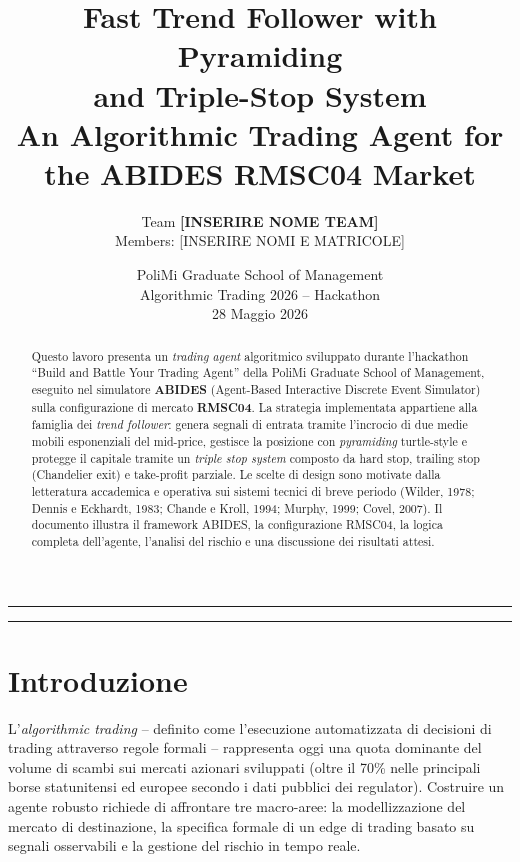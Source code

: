 \documentclass[11pt,a4paper]{article}
\title{\textbf{Fast Trend Follower with Pyramiding\\and Triple-Stop System}\\[0.6em]
       \large An Algorithmic Trading Agent for the ABIDES RMSC04 Market}
\author{Team \textbf{[INSERIRE NOME TEAM]} \\[0.2em]
        \small Members: [INSERIRE NOMI E MATRICOLE]}
\date{PoliMi Graduate School of Management\\
      Algorithmic Trading 2026 -- Hackathon\\
      28 Maggio 2026}
\begin{document}

\maketitle

\begin{abstract}
\noindent
Questo lavoro presenta un \emph{trading agent} algoritmico sviluppato
durante l'hackathon ``Build and Battle Your Trading Agent'' della
PoliMi Graduate School of Management, eseguito nel simulatore
\textbf{ABIDES} (Agent-Based Interactive Discrete Event Simulator)
sulla configurazione di mercato \textbf{RMSC04}.  La strategia
implementata appartiene alla famiglia dei \emph{trend follower}:
genera segnali di entrata tramite l'incrocio di due medie mobili
esponenziali del mid-price, gestisce la posizione con \emph{pyramiding}
turtle-style e protegge il capitale tramite un \emph{triple stop
system} composto da hard stop, trailing stop (Chandelier exit) e
take-profit parziale.  Le scelte di design sono motivate dalla
letteratura accademica e operativa sui sistemi tecnici di breve
periodo (Wilder, 1978; Dennis e Eckhardt, 1983; Chande e Kroll,
1994; Murphy, 1999; Covel, 2007).  Il documento illustra il
framework ABIDES, la configurazione RMSC04, la logica completa
dell'agente, l'analisi del rischio e una discussione dei risultati
attesi.
\end{abstract}

\vspace{1em}
\hrule
\vspace{1em}

\tableofcontents

\vspace{1em}
\hrule

\section{Introduzione}

L'\emph{algorithmic trading} -- definito come l'esecuzione automatizzata
di decisioni di trading attraverso regole formali -- rappresenta oggi
una quota dominante del volume di scambi sui mercati azionari
sviluppati (oltre il 70\% nelle principali borse statunitensi ed
europee secondo i dati pubblici dei regulator).  Costruire un agente
robusto richiede di affrontare tre macro-aree: la modellizzazione del
mercato di destinazione, la specifica formale di un edge di trading
basato su segnali osservabili e la gestione del rischio in tempo
reale.
\end{document}
